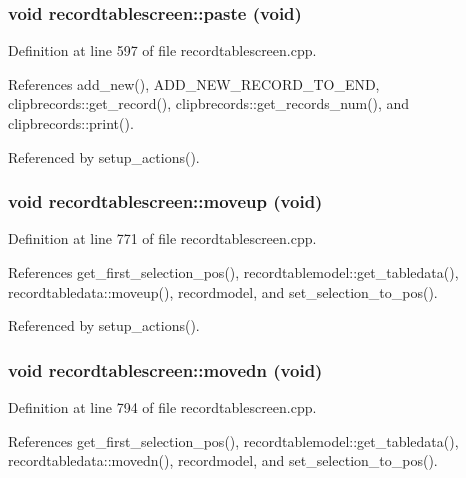 \subsubsection{\setlength{\rightskip}{0pt plus 5cm}void recordtablescreen::paste (void)\hspace{0.3cm}{\tt  [private, slot]}}\label{classrecordtablescreen_247769a42808ec37995b4609d7c1750e}




Definition at line 597 of file recordtablescreen.cpp.

References add\_\-new(), ADD\_\-NEW\_\-RECORD\_\-TO\_\-END, clipbrecords::get\_\-record(), clipbrecords::get\_\-records\_\-num(), and clipbrecords::print().

Referenced by setup\_\-actions().
\subsubsection{\setlength{\rightskip}{0pt plus 5cm}void recordtablescreen::moveup (void)\hspace{0.3cm}{\tt  [private, slot]}}\label{classrecordtablescreen_732e2c379f2a1149023965f1c62fab05}




Definition at line 771 of file recordtablescreen.cpp.

References get\_\-first\_\-selection\_\-pos(), recordtablemodel::get\_\-tabledata(), recordtabledata::moveup(), recordmodel, and set\_\-selection\_\-to\_\-pos().

Referenced by setup\_\-actions().
\subsubsection{\setlength{\rightskip}{0pt plus 5cm}void recordtablescreen::movedn (void)\hspace{0.3cm}{\tt  [private, slot]}}\label{classrecordtablescreen_fc3e465b3266eb01ee0a1f95839f7edd}




Definition at line 794 of file recordtablescreen.cpp.

References get\_\-first\_\-selection\_\-pos(), recordtablemodel::get\_\-tabledata(), recordtabledata::movedn(), recordmodel, and set\_\-selection\_\-to\_\-pos().

